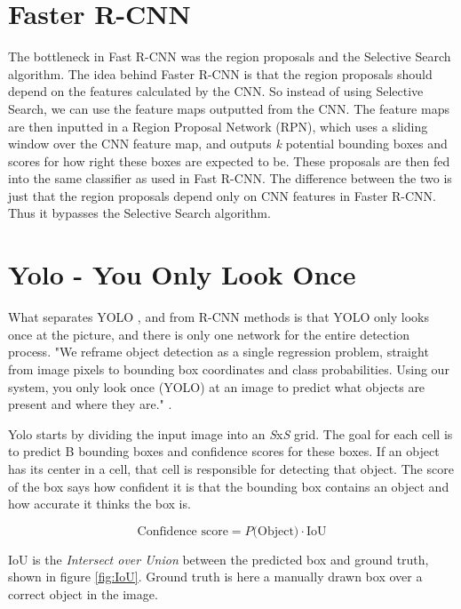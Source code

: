 \section{Faster R-CNN }
The bottleneck in Fast R-CNN was the region proposals and the Selective Search algorithm. The idea behind Faster R-CNN \citep{FasterR-CNN} is that the region proposals should depend on the features calculated by the CNN. So instead of using Selective Search, we can use the feature maps outputted from the CNN. The feature maps are then inputted in a Region Proposal Network (RPN), which uses a sliding window over the CNN feature map, and outputs \textit{k} potential bounding boxes and scores for how right these boxes are expected to be. These proposals are then fed into the same classifier as used in Fast R-CNN. The difference between the two is just that the region proposals depend only on CNN features in Faster R-CNN. Thus it bypasses the Selective Search algorithm.



\section{Yolo - You Only Look Once }
\label{sec:yolo}
What separates YOLO \citep{YOLOv1}, \citep{YOLOv2} and \citep{YOLOv3} from R-CNN methods is that YOLO only looks once at the picture, and there is only one network for the entire detection process. "We reframe object detection as a single regression problem, straight from image pixels to bounding box coordinates and class probabilities. Using our system, you only look once (YOLO) at an image to predict what objects are present and where they are." \citep{YOLOv1}. 
\vspace{0.5cm}

\noindent
Yolo starts by dividing the input image into an \textit{S}x\textit{S} grid. The goal for each cell is to predict B bounding boxes and confidence scores for these boxes. If an object has its center in a cell, that cell is responsible for detecting that object. The score of the box says how confident it is that the bounding box contains an object and how accurate it thinks the box is. 

\begin{equation}
    \text{Confidence score} = P\text{(Object)} \cdot \text{IoU}
\end{equation}

\noindent
IoU is the \textit{Intersect over Union} between the predicted box and ground truth, shown in figure \ref{fig:IoU}. Ground truth is here a manually drawn box over a correct object in the image.


